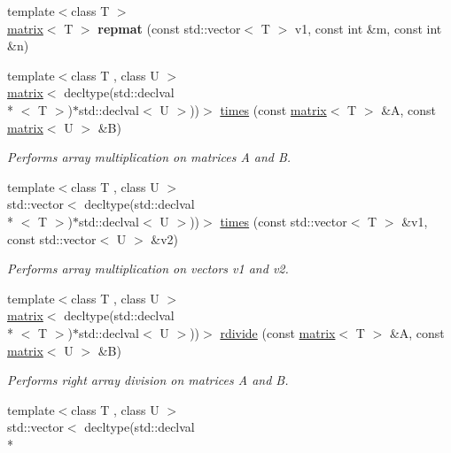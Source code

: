 \begin{DoxyCompactItemize}
\item 
\hypertarget{namespacekeycpp_ab7a41247c257a0244dd45c849a0ec3d1}{{\footnotesize template$<$class T $>$ }\\\hyperlink{classkeycpp_1_1matrix}{matrix}$<$ T $>$ {\bfseries repmat} (const std\-::vector$<$ T $>$ v1, const int \&m, const int \&n)}\label{namespacekeycpp_ab7a41247c257a0244dd45c849a0ec3d1}

\item 
{\footnotesize template$<$class T , class U $>$ }\\\hyperlink{classkeycpp_1_1matrix}{matrix}$<$ decltype(std\-::declval\\*
$<$ T $>$)$\ast$std\-::declval$<$ U $>$))$>$ \hyperlink{namespacekeycpp_ac1ff99e34619478096c271b38df1f3d7}{times} (const \hyperlink{classkeycpp_1_1matrix}{matrix}$<$ T $>$ \&A, const \hyperlink{classkeycpp_1_1matrix}{matrix}$<$ U $>$ \&B)
\begin{DoxyCompactList}\small\item\em Performs array multiplication on matrices A and B. \end{DoxyCompactList}\item 
{\footnotesize template$<$class T , class U $>$ }\\std\-::vector$<$ decltype(std\-::declval\\*
$<$ T $>$)$\ast$std\-::declval$<$ U $>$))$>$ \hyperlink{namespacekeycpp_a90d5fd4f9f7c52f16425105995655e9d}{times} (const std\-::vector$<$ T $>$ \&v1, const std\-::vector$<$ U $>$ \&v2)
\begin{DoxyCompactList}\small\item\em Performs array multiplication on vectors v1 and v2. \end{DoxyCompactList}\item 
{\footnotesize template$<$class T , class U $>$ }\\\hyperlink{classkeycpp_1_1matrix}{matrix}$<$ decltype(std\-::declval\\*
$<$ T $>$)$\ast$std\-::declval$<$ U $>$))$>$ \hyperlink{namespacekeycpp_aacd37d195541b2313b753b6e8839f916}{rdivide} (const \hyperlink{classkeycpp_1_1matrix}{matrix}$<$ T $>$ \&A, const \hyperlink{classkeycpp_1_1matrix}{matrix}$<$ U $>$ \&B)
\begin{DoxyCompactList}\small\item\em Performs right array division on matrices A and B. \end{DoxyCompactList}\item 
{\footnotesize template$<$class T , class U $>$ }\\std\-::vector$<$ decltype(std\-::declval\\*

\end{DoxyCompactItemize}
